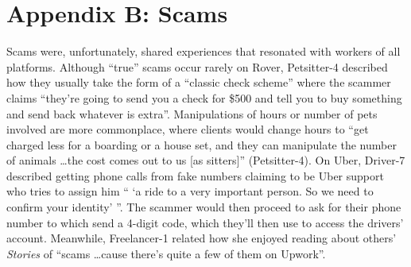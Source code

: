 \section{Appendix B: Scams} \label{scams}
Scams were, unfortunately, shared experiences that resonated with workers of all platforms. Although ``true'' scams occur rarely on Rover, Petsitter-4 described how they usually take the form of a ``classic check scheme'' where the scammer claims ``they're going to send you a check for \$500 and tell you to buy something and send back whatever is extra''. Manipulations of hours or number of pets involved are more commonplace, where clients would change hours to ``get charged less for a boarding or a house set, and they can manipulate the number of animals \dots the cost comes out to us [as sitters]'' (Petsitter-4). On Uber, Driver-7 described getting phone calls from fake numbers claiming to be Uber support who tries to assign him `` `a ride to a very important person. So we need to confirm your identity' ''. The scammer would then proceed to ask for their phone number to which send a 4-digit code, which they'll then use to access the drivers' account. Meanwhile, Freelancer-1 related how she enjoyed reading about others' \textit{Stories} of ``scams \dots cause there's quite a few of them on Upwork''.
